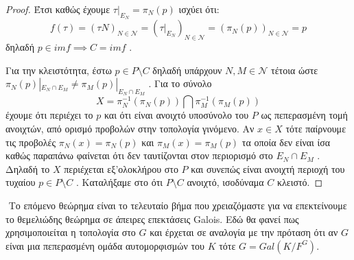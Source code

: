 \documentclass[oneside,a4paper]{article}
\newcommand {\tl}{\textlatin}
\begin{document}
\begin{proof}
Έτσι καθώς έχουμε $\tau |_{E_N}=\pi_N (p)$ ισχύει ότι:
$$f(\tau) = (\tau N)_{N \in \mathcal{N}} = (\tau|_{E_N})_{N \in \mathcal{N}} = (\pi_N (p))_{N \in \mathcal{N}} = p$$
δηλαδή $p \in imf \implies C=imf$ .

Για την κλειστότητα, έστω $p \in P\setminus C$ δηλαδή υπάρχουν $N,M \in \mathcal{N}$ τέτοια ώστε $\pi_N (p) |_{E_N \cap E_M} \neq \pi_M (p) |_{E_N \cap E_M}$ . Για το σύνολο
$$X = \pi^{-1}_N \left(\pi_N \left( p \right) \right) \bigcap \pi^{-1}_M \left(\pi_M \left( p \right) \right)$$
έχουμε ότι περιέχει το $p$ και ότι είναι ανοιχτό υποσύνολο του $P$ ως πεπερασμένη τομή ανοιχτών, από ορισμό προβολών στην τοπολογία γινόμενο. Αν $x \in X$ τότε παίρνουμε τις προβολές $\pi_N(x) = \pi_N (p)$ και $\pi_M (x) = \pi_M (p)$ τα οποία δεν είναι ίσα καθώς παραπάνω φαίνεται ότι δεν ταυτίζονται στον περιορισμό στο $E_N \cap E_M$ . Δηλαδή το $X$ περιέχεται εξ'ολοκλήρου στο $P$ και συνεπώς είναι ανοιχτή περιοχή του τυχαίου $p \in P\setminus C$ . Καταλήξαμε στο ότι $P\setminus C$ ανοιχτό, ισοδύναμα $C$ κλειστό.
\end{proof}

$ $\newline
\noindent Το επόμενο θεώρημα είναι το τελευταίο βήμα που χρειαζόμαστε για να επεκτείνουμε το θεμελιώδης θεώρημα σε άπειρες επεκτάσεις \tl{Galois}. Εδώ θα φανεί πως χρησιμοποιείται η τοπολογία στο $G$ και έρχεται σε αναλογία με την πρόταση ότι αν $G$ είναι μια πεπερασμένη ομάδα αυτομορφισμών του $K$ τότε $G = Gal(K/F^G)$.
\end{document}
